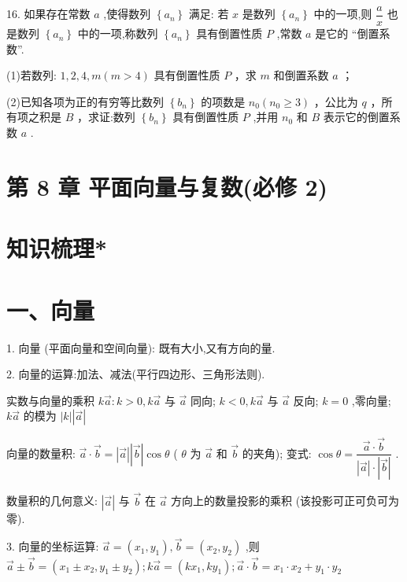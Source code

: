 16. 如果存在常数 $a$ ,使得数列 $\left\{  {a}_{n}\right\}$ 满足: 若 $x$ 是数列 $\left\{  {a}_{n}\right\}$ 中的一项,则 $\dfrac{a}{x}$ 也是数列 $\left\{  {a}_{n}\right\}$ 中的一项,称数列 $\left\{  {a}_{n}\right\}$ 具有倒置性质 $P$ ,常数 $a$ 是它的 “倒置系数”.

(1)若数列: $1,2,4,m\left( {m > 4}\right)$ 具有倒置性质 $P$ ，求 $m$ 和倒置系数 $a$ ；

(2)已知各项为正的有穷等比数列 $\left\{  {b}_{n}\right\}$ 的项数是 ${n}_{0}\left( {{n}_{0} \geq  3}\right)$ ，公比为 $q$ ，所有项之积是 $B$ ，求证:数列 $\left\{  {b}_{n}\right\}$ 具有倒置性质 $P$ ,并用 ${n}_{0}$ 和 $B$ 表示它的倒置系数 $a$ .

\section*{第 8 章 平面向量与复数(必修 2)}

\section*{知识梳理*}

\section*{一、向量}

1. 向量 (平面向量和空间向量): 既有大小,又有方向的量.

2. 向量的运算:加法、减法(平行四边形、三角形法则).

实数与向量的乘积 $k\overrightarrow{a} : k > 0,k\overrightarrow{a}$ 与 $\overrightarrow{a}$ 同向; $k < 0,k\overrightarrow{a}$ 与 $\overrightarrow{a}$ 反向; $k = 0$ ,零向量; $k\overrightarrow{a}$ 的模为 $\left| k\right| \left| \overrightarrow{a}\right|$

向量的数量积: $\overrightarrow{a} \cdot  \overrightarrow{b} = \left| \overrightarrow{a}\right| \left| \overrightarrow{b}\right| \cos \theta$ ( $\theta$ 为 $\overrightarrow{a}$ 和 $\overrightarrow{b}$ 的夹角); 变式: $\cos \theta  = \dfrac{\overrightarrow{a} \cdot  \overrightarrow{b}}{\left| \overrightarrow{a}\right|  \cdot  \left| \overrightarrow{b}\right| }$ .

数量积的几何意义: $\left| \overrightarrow{a}\right|$ 与 $\overrightarrow{b}$ 在 $\overrightarrow{a}$ 方向上的数量投影的乘积 (该投影可正可负可为零).

3. 向量的坐标运算: $\overrightarrow{a} = \left( {{x}_{1},{y}_{1}}\right) ,\overrightarrow{b} = \left( {{x}_{2},{y}_{2}}\right)$ ,则 $\overrightarrow{a} \pm  \overrightarrow{b} = \left( {{x}_{1} \pm  {x}_{2},{y}_{1} \pm  {y}_{2}}\right) ;k\overrightarrow{a} = \left( {k{x}_{1},k{y}_{1}}\right) ;\overrightarrow{a} \cdot  \overrightarrow{b} =  {x}_{1} \cdot  {x}_{2} + {y}_{1} \cdot  {y}_{2}$

